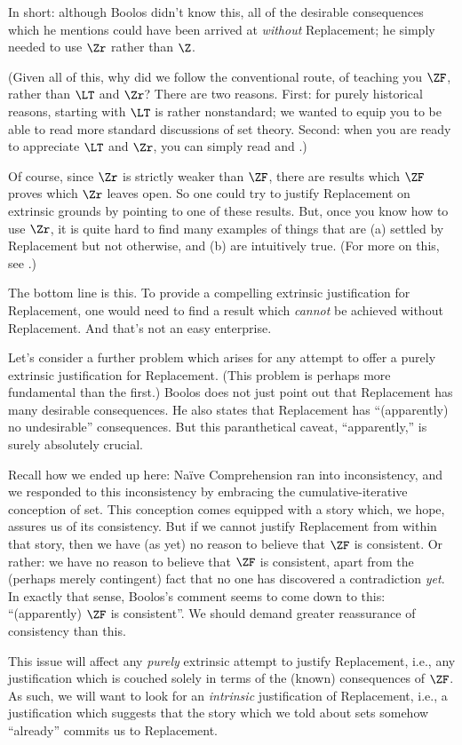 \documentclass[../../../include/open-logic-section]{subfiles}
\begin{document}
In
short: although Boolos didn't know this, all of the desirable
consequences which he mentions could have been arrived at
\emph{without} Replacement; he simply needed to use $\Zr$ rather than $\Z$. 

(Given all of this, why did we follow the conventional route, of
teaching you $\ZF$, rather than $\LT$ and $\Zr$? There are two reasons. First: for purely historical reasons, starting with $\LT$ is rather nonstandard; we wanted to
equip you to be able to read more standard discussions of set theory. Second: when you are ready to
appreciate $\LT$ and $\Zr$, you can simply read \citealt{Potter2004} and \citealt{ButtonLT1}.)

Of course, since $\Zr$ is strictly weaker than $\ZF$, there are results which
$\ZF$ proves which $\Zr$ leaves open. So one could try to justify
Replacement on extrinsic grounds by pointing to one of these results.
But, once you know how to use $\Zr$, it is quite hard to find many
examples of things that are (a) settled by Replacement but not
otherwise, and (b) are intuitively true. (For more on this, see
\citealt[\S13.2]{Potter2004}.)

The bottom line is this. To provide a compelling extrinsic
justification for Replacement, one would need to find a result which
\emph{cannot} be achieved without Replacement. And that's not an easy
enterprise. 

Let's consider a further problem which arises for any attempt to offer
a purely extrinsic justification for Replacement. (This problem is
perhaps more fundamental than the first.) Boolos does not just point
out that Replacement has many desirable consequences. He also states
that Replacement has ``(apparently) no undesirable'' consequences. But
this paranthetical caveat, ``apparently,'' is surely absolutely
crucial.

Recall how we ended up here: Na\"ive Comprehension ran into
inconsistency, and we responded to this inconsistency by embracing the
cumulative-iterative conception of set. This conception comes equipped
with a story which, we hope, assures us of its consistency. But if we
cannot justify Replacement from within that story, then we have (as
yet) no reason to believe that $\ZF$ is consistent. Or rather: we have
no reason to believe that $\ZF$ is consistent, apart from the (perhaps
merely contingent) fact that no one has discovered a contradiction
\emph{yet}. In exactly that sense, Boolos's comment seems to come down
to this: ``(apparently) $\ZF$ is consistent''. We should demand
greater reassurance of consistency than this. 

This issue will affect any \emph{purely} extrinsic attempt to justify
Replacement, i.e., any justification which is couched solely in terms
of the (known) consequences of $\ZF$. As such, we will want to look
for an \emph{intrinsic} justification of Replacement, i.e., a
justification which suggests that the story which we told about sets
somehow ``already'' commits us to Replacement. 
\end{document}
